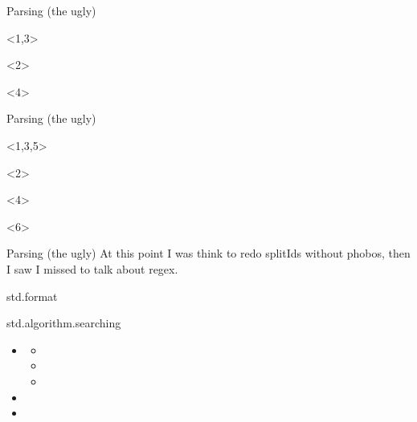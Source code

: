 \documentclass[aspectratio=169,notes]{beamer}
\begin{document}
	\begin{frame}[fragile]{Parsing (the ugly)}
		\begin{onlyenv}
			
		\end{onlyenv}
		\begin{onlyenv}<2>
			
		\end{onlyenv}
		\begin{onlyenv}<4>
			
		\end{onlyenv}
	\end{frame}
	\begin{frame}[fragile]{Parsing (the ugly)}
		\begin{onlyenv}<1,3,5>
			
		\end{onlyenv}
		\begin{onlyenv}<2>
			
		\end{onlyenv}
		\begin{onlyenv}<4>
			
		\end{onlyenv}
		\begin{onlyenv}<6>
			
		\end{onlyenv}
	\end{frame}
	\begin{frame}[fragile]{Parsing (the ugly)}
At this point I was think to redo splitIds without phobos, then I saw I missed to
talk about regex.
	\end{frame}

	\begin{frame}[fragile]{std.format}
		
	\end{frame}

	\begin{frame}[fragile]{std.algorithm.searching}
		\begin{itemize}
			\item \lstinline@find@
			\begin{itemize}
				\item \lstinline@canFind@
				\item \lstinline@until@
				\item \lstinline@countUntil@
			\end{itemize}
			\item \lstinline@startsWith@
			\item \lstinline@endsWith@
		\end{itemize}
	\end{frame}
\end{document}
